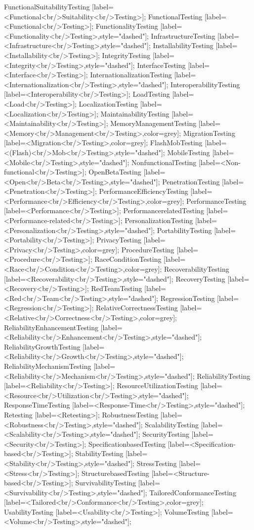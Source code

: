 \documentclass{article}
\begin{document}
{FunctionalSuitabilityTesting [label=<Functional<br/>Suitability<br/>Testing>];
FunctionalTesting [label=<Functional<br/>Testing>];
FunctionalityTesting [label=<Functionality<br/>Testing>,style="dashed"];
InfrastructureTesting [label=<Infrastructure<br/>Testing>,style="dashed"];
InstallabilityTesting [label=<Installability<br/>Testing>];
IntegrityTesting [label=<Integrity<br/>Testing>,style="dashed"];
InterfaceTesting [label=<Interface<br/>Testing>];
InternationalizationTesting [label=<Internationalization<br/>Testing>,style="dashed"];
InteroperabilityTesting [label=<Interoperability<br/>Testing>];
LoadTesting [label=<Load<br/>Testing>];
LocalizationTesting [label=<Localization<br/>Testing>];
MaintainabilityTesting [label=<Maintainability<br/>Testing>];
MemoryManagementTesting [label=<Memory<br/>Management<br/>Testing>,color=grey];
MigrationTesting [label=<Migration<br/>Testing>,color=grey];
FlashMobTesting [label=<(Flash)<br/>Mob<br/>Testing>,style="dashed"];
MobileTesting [label=<Mobile<br/>Testing>,style="dashed"];
NonfunctionalTesting [label=<Non-functional<br/>Testing>];
OpenBetaTesting [label=<Open<br/>Beta<br/>Testing>,style="dashed"];
PenetrationTesting [label=<Penetration<br/>Testing>];
PerformanceEfficiencyTesting [label=<Performance<br/>Efficiency<br/>Testing>,color=grey];
PerformanceTesting [label=<Performance<br/>Testing>];
PerformancerelatedTesting [label=<Performance-related<br/>Testing>];
PersonalizationTesting [label=<Personalization<br/>Testing>,style="dashed"];
PortabilityTesting [label=<Portability<br/>Testing>];
PrivacyTesting [label=<Privacy<br/>Testing>,color=grey];
ProcedureTesting [label=<Procedure<br/>Testing>];
RaceConditionTesting [label=<Race<br/>Condition<br/>Testing>,color=grey];
RecoverabilityTesting [label=<Recoverability<br/>Testing>,style="dashed"];
RecoveryTesting [label=<Recovery<br/>Testing>];
RedTeamTesting [label=<Red<br/>Team<br/>Testing>,style="dashed"];
RegressionTesting [label=<Regression<br/>Testing>];
RelativeCorrectnessTesting [label=<Relative<br/>Correctness<br/>Testing>,color=grey];
ReliabilityEnhancementTesting [label=<Reliability<br/>Enhancement<br/>Testing>,style="dashed"];
ReliabilityGrowthTesting [label=<Reliability<br/>Growth<br/>Testing>,style="dashed"];
ReliabilityMechanismTesting [label=<Reliability<br/>Mechanism<br/>Testing>,style="dashed"];
ReliabilityTesting [label=<Reliability<br/>Testing>];
ResourceUtilizationTesting [label=<Resource<br/>Utilization<br/>Testing>,style="dashed"];
ResponseTimeTesting [label=<Response-Time<br/>Testing>,style="dashed"];
Retesting [label=<Retesting>];
RobustnessTesting [label=<Robustness<br/>Testing>,style="dashed"];
ScalabilityTesting [label=<Scalability<br/>Testing>,style="dashed"];
SecurityTesting [label=<Security<br/>Testing>];
SpecificationbasedTesting [label=<Specification-based<br/>Testing>];
StabilityTesting [label=<Stability<br/>Testing>,style="dashed"];
StressTesting [label=<Stress<br/>Testing>];
StructurebasedTesting [label=<Structure-based<br/>Testing>];
SurvivabilityTesting [label=<Survivability<br/>Testing>,style="dashed"];
TailoredConformanceTesting [label=<Tailored<br/>Conformance<br/>Testing>,color=grey];
UsabilityTesting [label=<Usability<br/>Testing>];
VolumeTesting [label=<Volume<br/>Testing>,style="dashed"];

}
\end{document}
